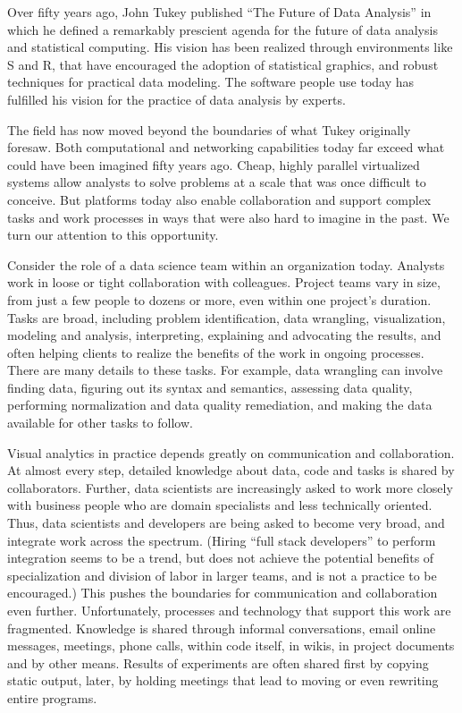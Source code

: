 
\maketitle

Over fifty years ago, John Tukey published ``The Future of Data Analysis''
in which he defined a remarkably prescient agenda for the future of
data analysis and statistical computing. His vision has been realized
through environments like S and R, that have encouraged the adoption of
statistical graphics, and robust techniques for practical data modeling.
The software people use today has fulfilled his vision for the practice
of data analysis by experts.

The field has now moved beyond the boundaries of what Tukey originally
foresaw. Both computational and networking capabilities today far exceed
what could have been imagined fifty years ago. Cheap, highly parallel
virtualized systems allow analysts to solve problems at a scale that
was once difficult to conceive. But platforms today also enable collaboration
and support complex tasks and work processes in ways that were also
hard to imagine in the past. We turn our attention to this opportunity.

Consider the role of a data science team within an organization today.
Analysts work in loose or tight collaboration with colleagues.
Project teams vary in size, from just a few people to dozens or
more, even within one project's duration. Tasks are broad, including problem
identification, data wrangling, visualization, modeling and analysis,
interpreting, explaining and advocating the results, and often helping
clients to realize the benefits of the work in ongoing processes.
There are many details to these tasks.
For example, data wrangling can involve finding data, figuring out its
syntax and semantics, assessing data quality, performing normalization and
data quality remediation, and making the data available for other tasks
to follow.

Visual analytics in practice depends greatly on communication and collaboration.
At almost every step, detailed knowledge about data, code and tasks
is shared by collaborators. 
Further, data scientists are increasingly asked to work more closely
with business people who are domain specialists and less technically oriented.
Thus, data scientists and developers are being asked to become
very broad, and integrate work across the spectrum. (Hiring ``full stack
developers'' to perform integration seems to be a trend, but does not achieve
the potential benefits of specialization and division of labor in larger
teams, and is not a practice to be encouraged.)
This pushes the boundaries for communication and collaboration even further.
Unfortunately, processes and technology that support this work are fragmented.
Knowledge is shared through informal conversations, email online messages,
meetings, phone calls, within code itself, in wikis, in project documents and
by other means. Results of experiments are often shared first by copying static
output, later, by holding meetings that lead to moving or even rewriting
entire programs.

